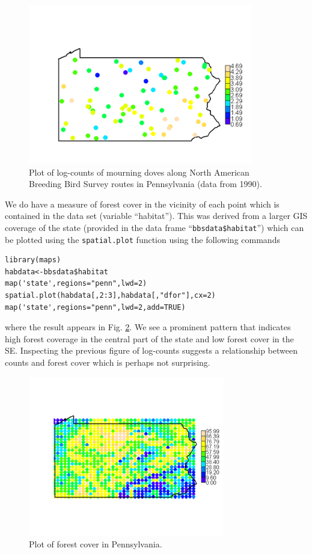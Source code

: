 \begin{figure}
\begin{center}
\includegraphics[height=2.75in]{Ch2/figs/PA1}
\end{center}
\caption{Plot of log-counts of mourning doves along North American Breeding Bird Survey routes in Pennsylvania (data from 1990).}
\label{glms.fig.padovecounts}
\end{figure}

We do have a measure of forest cover in the vicinity of each point
which is contained in the data set (variable ``habitat''). This was derived
from a larger GIS coverage of the state (provided in the data frame
``\mbox{\tt bbsdata\$habitat}'') which can be plotted using the \mbox{\tt spatial.plot} function
using the following commands
{\small
\begin{verbatim}
library(maps)
habdata<-bbsdata$habitat
map('state',regions="penn",lwd=2)
spatial.plot(habdata[,2:3],habdata[,"dfor"],cx=2)
map('state',regions="penn",lwd=2,add=TRUE)
\end{verbatim}
}
where the result appears in Fig. \ref{glms.fig.paforest}.
We see a prominent pattern that indicates high forest coverage in the
central part of the state and low forest cover in the SE.  Inspecting
the previous figure of log-counts suggests a relationship between
counts and forest cover which is perhaps not surprising.
\begin{figure}
\begin{center}
\includegraphics[height=2.75in]{Ch2/figs/PA2}
\end{center}
\caption{Plot of forest cover in Pennsylvania.}
\label{glms.fig.paforest}
\end{figure}

